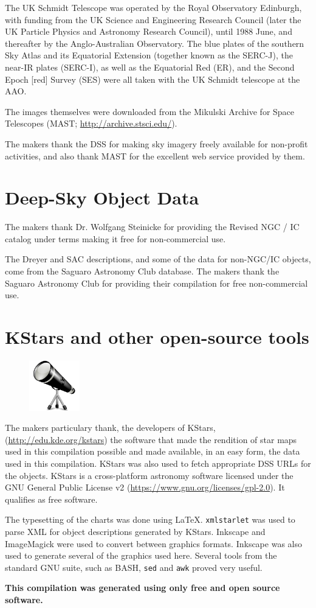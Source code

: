 The UK Schmidt Telescope was operated by the Royal Observatory
Edinburgh, with funding from the UK Science and Engineering Research
Council (later the UK Particle Physics and Astronomy Research
Council), until 1988 June, and thereafter by the Anglo-Australian
Observatory. The blue plates of the southern Sky Atlas and its
Equatorial Extension (together known as the SERC-J), the near-IR
plates (SERC-I), as well as the Equatorial Red (ER), and the Second
Epoch [red] Survey (SES) were all taken with the UK Schmidt telescope
at the AAO.

The images themselves were downloaded from the Mikulski Archive for
Space Telescopes (MAST; \url{http://archive.stsci.edu/}).

The makers thank the DSS for making sky imagery freely available for
non-profit activities, and also thank MAST for the excellent web
service provided by them.

\section*{Deep-Sky Object Data}

The makers thank Dr. Wolfgang Steinicke for providing the Revised NGC
/ IC catalog under terms making it free for non-commercial use.

The Dreyer and SAC descriptions, and some of the data for non-NGC/IC
objects, come from the Saguaro Astronomy Club database. The makers
thank the Saguaro Astronomy Club for providing their compilation for
free non-commercial use.
\clearpage
\section*{KStars and other open-source tools}
\begin{figure}
\centering
\includegraphics[width=0.195\textwidth]{kstars.pdf}
\end{figure}
The makers particulary thank, the developers of KStars,
(\url{http://edu.kde.org/kstars}) the software that made the rendition
of star maps used in this compilation possible and made available, in
an easy form, the data used in this compilation. KStars was also used
to fetch appropriate DSS URLs for the objects. KStars is a
cross-platform astronomy software licensed under the GNU General
Public License v2 (\url{https://www.gnu.org/licenses/gpl-2.0}). It
qualifies as free software.

The typesetting of the charts was done using
\LaTeX. \texttt{xmlstarlet} was used to parse XML for object
descriptions generated by KStars. Inkscape and ImageMagick were used
to convert between graphics formats. Inkscape was also used to
generate several of the graphics used here. Several tools from the
standard GNU suite, such as BASH, \texttt{sed} and \texttt{awk} proved
very useful.

\textbf{This compilation was generated using only free and open source
software.}
